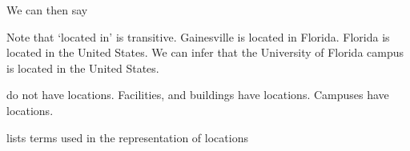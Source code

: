 \documentclass[letterpaper,10pt,english]{sphinxmanual}
\begin{document}
\sphinxAtStartPar
We can then say

\begin{sphinxVerbatim}[commandchars=\\\{\}]
          
       
       
\end{sphinxVerbatim}

\sphinxAtStartPar
Note that ‘located in’ is transitive.  Gainesville is located in Florida.  Florida is
located in the United States.  We can infer that the University of Florida campus is
located in the United States.

\sphinxAtStartPar
{\hyperref[\detokenize{organizations::doc}]{}} do not have locations.  Facilities, and buildings
have locations. Campuses have locations.

\sphinxAtStartPar
{\hyperref[\detokenize{locations:table-14}]{}} lists terms used in the representation of locations
\end{document}
